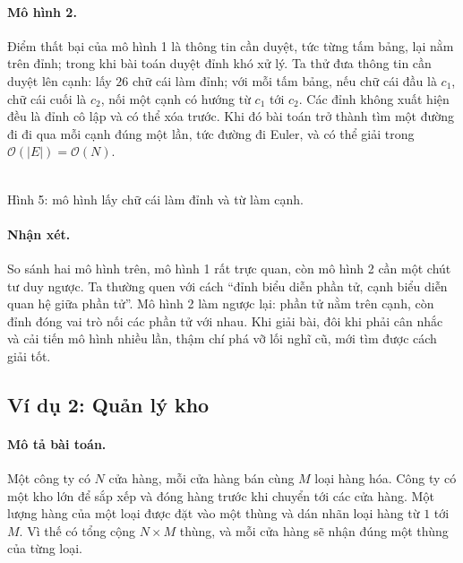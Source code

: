 \documentclass[11pt]{article}
\newcommand{\Oh}{\mathcal{O}}
\begin{document}
\paragraph{Mô hình 2.}
Điểm thất bại của mô hình 1 là thông tin cần duyệt, tức từng tấm bảng, lại
nằm trên đỉnh; trong khi bài toán duyệt đỉnh khó xử lý. Ta thử đưa thông tin
cần duyệt lên cạnh: lấy \(26\) chữ cái làm đỉnh; với mỗi tấm bảng, nếu chữ cái
đầu là \(c_1\), chữ cái cuối là \(c_2\), nối một cạnh có hướng từ \(c_1\) tới
\(c_2\). Các đỉnh không xuất hiện đều là đỉnh cô lập và có thể xóa trước. Khi
đó bài toán trở thành tìm một đường đi đi qua mỗi cạnh đúng một lần, tức đường
đi Euler, và có thể giải trong \(\Oh(|E|)=\Oh(N)\).

\begin{center}
\\
\small Hình 5: mô hình lấy chữ cái làm đỉnh và từ làm cạnh.
\end{center}

\paragraph{Nhận xét.}
So sánh hai mô hình trên, mô hình 1 rất trực quan, còn mô hình 2 cần một chút
tư duy ngược. Ta thường quen với cách ``đỉnh biểu diễn phần tử, cạnh biểu diễn
quan hệ giữa phần tử''. Mô hình 2 làm ngược lại: phần tử nằm trên cạnh, còn
đỉnh đóng vai trò nối các phần tử với nhau. Khi giải bài, đôi khi phải cân
nhắc và cải tiến mô hình nhiều lần, thậm chí phá vỡ lối nghĩ cũ, mới tìm được
cách giải tốt.

\subsection{Ví dụ 2: Quản lý kho}

\paragraph{Mô tả bài toán.}
Một công ty có \(N\) cửa hàng, mỗi cửa hàng bán cùng \(M\) loại hàng hóa. Công
ty có một kho lớn để sắp xếp và đóng hàng trước khi chuyển tới các cửa hàng.
Một lượng hàng của một loại được đặt vào một thùng và dán nhãn loại hàng từ
\(1\) tới \(M\). Vì thế có tổng cộng \(N\times M\) thùng, và mỗi cửa hàng sẽ
nhận đúng một thùng của từng loại.
\end{document}
